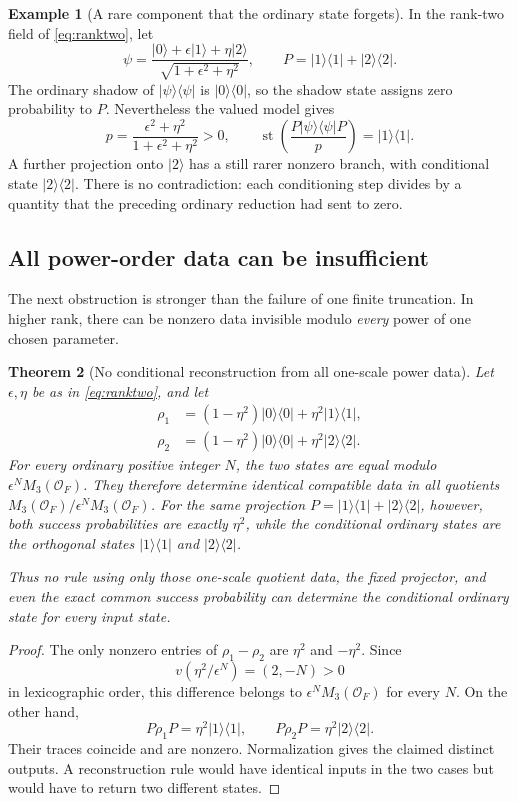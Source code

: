 \documentclass[11pt,oneside]{article}
\numberwithin{equation}{section}
\theoremstyle{plain}
\newtheorem{theorem}{Theorem}[section]
\theoremstyle{definition}
\newtheorem{example}[theorem]{Example}
\theoremstyle{remark}
\newcommand{\OO}{\mathcal O}
\newcommand{\st}{\operatorname{st}}
\newcommand{\ket}[1]{\lvert#1\rangle}
\newcommand{\bra}[1]{\langle#1\rvert}
\newcommand{\proj}[1]{\ket{#1}\!\bra{#1}}
\begin{document}
\begin{example}[A rare component that the ordinary state forgets]\label{ex:rare3}
In the rank-two field of \eqref{eq:ranktwo}, let
\[
 \psi=\frac{\ket{0}+\epsilon\ket{1}+\eta\ket{2}}
 {\sqrt{1+\epsilon^2+\eta^2}},\qquad
 P=\proj{1}+\proj{2}.
\]
The ordinary shadow of $\proj{\psi}$ is $\proj{0}$, so the shadow state assigns zero probability to $P$. Nevertheless the valued model gives
\[
 p=\frac{\epsilon^2+\eta^2}{1+\epsilon^2+\eta^2}>0,
 \qquad
 \st\!\left(\frac{P\proj{\psi}P}{p}\right)=\proj{1}.
\]
A further projection onto $\ket{2}$ has a still rarer nonzero branch, with conditional state $\proj{2}$. There is no contradiction: each conditioning step divides by a quantity that the preceding ordinary reduction had sent to zero.
\end{example}

\subsection{All power-order data can be insufficient}
The next obstruction is stronger than the failure of one finite truncation. In higher rank, there can be nonzero data invisible modulo \emph{every} power of one chosen parameter.

\begin{theorem}[No conditional reconstruction from all one-scale power data]\label{thm:alljets}
Let $\epsilon,\eta$ be as in \eqref{eq:ranktwo}, and let
\begin{align*}
 \rho_1&=(1-\eta^2)\proj{0}+\eta^2\proj{1},\\
 \rho_2&=(1-\eta^2)\proj{0}+\eta^2\proj{2}.
\end{align*}
For every ordinary positive integer $N$, the two states are equal modulo
$\epsilon^N M_3(\OO_F)$. They therefore determine identical compatible data in all quotients $M_3(\OO_F)/\epsilon^N M_3(\OO_F)$. For the same projection $P=\proj{1}+\proj{2}$, however, both success probabilities are exactly $\eta^2$, while the conditional ordinary states are the orthogonal states $\proj{1}$ and $\proj{2}$.

Thus no rule using only those one-scale quotient data, the fixed projector, and even the exact common success probability can determine the conditional ordinary state for every input state.
\end{theorem}
\begin{proof}
The only nonzero entries of $\rho_1-\rho_2$ are $\eta^2$ and $-\eta^2$. Since
\[
 v(\eta^2/\epsilon^N)=(2,-N)>0
\]
in lexicographic order, this difference belongs to $\epsilon^N M_3(\OO_F)$ for every $N$. On the other hand,
\[
 P\rho_1P=\eta^2\proj{1},\qquad
 P\rho_2P=\eta^2\proj{2}.
\]
Their traces coincide and are nonzero. Normalization gives the claimed distinct outputs. A reconstruction rule would have identical inputs in the two cases but would have to return two different states.
\end{proof}
\end{document}
